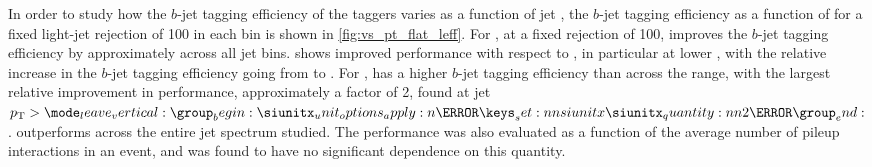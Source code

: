 
In order to study how the $b$-jet tagging efficiency of the taggers varies as a function of jet \pt, the $b$-jet tagging efficiency as a function of \pt for a fixed light-jet rejection of 100 in each bin is shown in \cref{fig:vs_pt_flat_leff}.
For \ttbarjets, at a fixed \ljet rejection of 100, \GNN improves the $b$-jet tagging efficiency by approximately  across all jet \pt bins.
\GNNLep shows improved performance with respect to \GNN, in particular at lower \pt, with the relative increase in the $b$-jet tagging efficiency going from  to .
For \Zprimejets, \GNN has a higher $b$-jet tagging efficiency than \DLr across the \pt range, with the largest relative improvement in performance, approximately a factor of 2, found at jet $\pt > \SI{2}{\TeV}$.
\GNN outperforms \DLr across the entire jet \pt spectrum studied. 
The performance was also evaluated as a function of the average number of pileup interactions in an event, and was found to have no significant dependence on this quantity.

